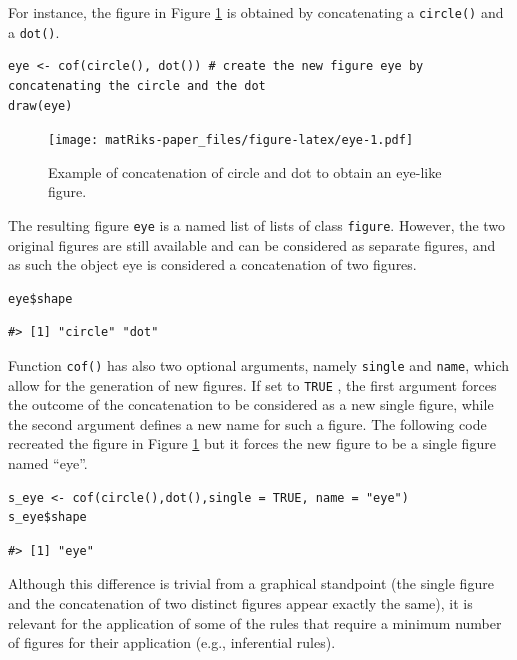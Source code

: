 For instance, the figure in Figure \ref{fig:eye} is obtained by concatenating a \texttt{circle()} and a \texttt{dot()}.

\begin{verbatim}
eye <- cof(circle(), dot()) # create the new figure eye by concatenating the circle and the dot
draw(eye)
\end{verbatim}

\begin{figure}
\centering
\texttt{[image: matRiks-paper\_files/figure-latex/eye-1.pdf]}
\caption{\label{fig:eye}Example of concatenation of circle and dot to obtain an eye-like figure.}
\end{figure}

The resulting figure \texttt{eye} is a named list of lists of class \texttt{figure}.
However, the two original figures are still available and can be considered as separate figures, and as such the object eye is considered a concatenation of two figures.

\begin{verbatim}
eye$shape
\end{verbatim}

\begin{verbatim}
#> [1] "circle" "dot"
\end{verbatim}

Function \texttt{cof()} has also two optional arguments, namely \texttt{single} and \texttt{name}, which allow for the generation of new figures.
If set to \texttt{TRUE} , the first argument forces the outcome of the concatenation to be considered as a new single figure, while the second argument defines a new name for such a figure.
The following code recreated the figure in Figure \ref{fig:eye} but it forces the new figure to be a single figure named ``eye''.

\begin{verbatim}
s_eye <- cof(circle(),dot(),single = TRUE, name = "eye")
s_eye$shape
\end{verbatim}

\begin{verbatim}
#> [1] "eye"
\end{verbatim}

Although this difference is trivial from a graphical standpoint (the single figure and the concatenation of two distinct figures appear exactly the same), it is relevant for the application of some of the rules that require a minimum number of figures for their application (e.g., inferential rules).

